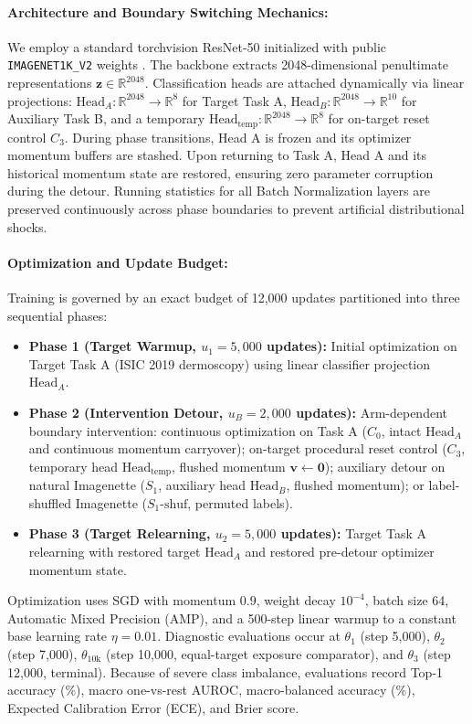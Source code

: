 \documentclass[sn-mathphys,Numbered]{sn-jnl}
\begin{document}
\paragraph{Architecture and Boundary Switching Mechanics:}
We employ a standard torchvision ResNet-50 initialized with public \texttt{IMAGENET1K\_V2} weights \cite{he2016deep,wightman2021resnet}. The backbone extracts 2048-dimensional penultimate representations $\bm{z} \in \mathbb{R}^{2048}$. Classification heads are attached dynamically via linear projections: $\mathrm{Head}_A: \mathbb{R}^{2048} \to \mathbb{R}^8$ for Target Task A, $\mathrm{Head}_B: \mathbb{R}^{2048} \to \mathbb{R}^{10}$ for Auxiliary Task B, and a temporary $\mathrm{Head}_{\mathrm{temp}}: \mathbb{R}^{2048} \to \mathbb{R}^8$ for on-target reset control $C_3$. During phase transitions, Head A is frozen and its optimizer momentum buffers are stashed. Upon returning to Task A, Head A and its historical momentum state are restored, ensuring zero parameter corruption during the detour. Running statistics for all Batch Normalization layers are preserved continuously across phase boundaries to prevent artificial distributional shocks.

\paragraph{Optimization and Update Budget:}
Training is governed by an exact budget of 12,000 updates partitioned into three sequential phases:
\begin{itemize}
    \item \textbf{Phase 1 (Target Warmup, $u_1 = 5{,}000$ updates):} Initial optimization on Target Task A (ISIC 2019 dermoscopy) using linear classifier projection $\mathrm{Head}_A$.
    \item \textbf{Phase 2 (Intervention Detour, $u_B = 2{,}000$ updates):} Arm-dependent boundary intervention: continuous optimization on Task A ($C_0$, intact $\mathrm{Head}_A$ and continuous momentum carryover); on-target procedural reset control ($C_3$, temporary head $\mathrm{Head}_{\mathrm{temp}}$, flushed momentum $\bm{v} \leftarrow \mathbf{0}$); auxiliary detour on natural Imagenette ($S_1$, auxiliary head $\mathrm{Head}_B$, flushed momentum); or label-shuffled Imagenette ($S_1\text{-shuf}$, permuted labels).
    \item \textbf{Phase 3 (Target Relearning, $u_2 = 5{,}000$ updates):} Target Task A relearning with restored target $\mathrm{Head}_A$ and restored pre-detour optimizer momentum state.
\end{itemize}
Optimization uses SGD with momentum $0.9$, weight decay $10^{-4}$, batch size 64, Automatic Mixed Precision (AMP), and a 500-step linear warmup to a constant base learning rate $\eta = 0.01$. Diagnostic evaluations occur at $\theta_1$ (step 5,000), $\theta_2$ (step 7,000), $\theta_{\mathrm{10k}}$ (step 10,000, equal-target exposure comparator), and $\theta_3$ (step 12,000, terminal). Because of severe class imbalance, evaluations record Top-1 accuracy (\%), macro one-vs-rest AUROC, macro-balanced accuracy (\%), Expected Calibration Error (ECE), and Brier score.
\end{document}
